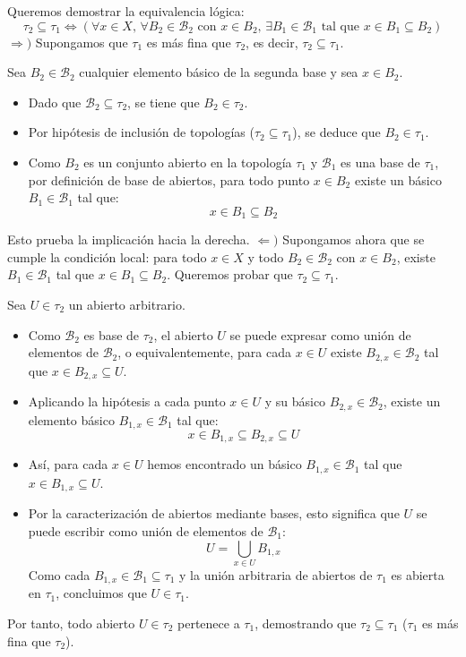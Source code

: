 \begin{sol}
    Queremos demostrar la equivalencia lógica:
    \[
        \tau_2 \subseteq \tau_1 \iff \left( \forall x \in X, \, \forall B_2 \in \mathcal{B}_2 \text{ con } x \in B_2, \, \exists B_1 \in \mathcal{B}_1 \text{ tal que } x \in B_1 \subseteq B_2 \right)
    \]
    $\Rightarrow)$ Supongamos que $\tau_1$ es más fina que $\tau_2$, es decir, $\tau_2 \subseteq \tau_1$.
    
    Sea $B_2 \in \mathcal{B}_2$ cualquier elemento básico de la segunda base y sea $x \in B_2$.
    \begin{itemize}
        \item Dado que $\mathcal{B}_2 \subseteq \tau_2$, se tiene que $B_2 \in \tau_2$.
        \item Por hipótesis de inclusión de topologías ($\tau_2 \subseteq \tau_1$), se deduce que $B_2 \in \tau_1$.
        \item Como $B_2$ es un conjunto abierto en la topología $\tau_1$ y $\mathcal{B}_1$ es una base de $\tau_1$, por definición de base de abiertos, para todo punto $x \in B_2$ existe un básico $B_1 \in \mathcal{B}_1$ tal que:
        \[
            x \in B_1 \subseteq B_2
        \]
    \end{itemize}
    Esto prueba la implicación hacia la derecha.
    $\Leftarrow)$ Supongamos ahora que se cumple la condición local: para todo $x \in X$ y todo $B_2 \in \mathcal{B}_2$ con $x \in B_2$, existe $B_1 \in \mathcal{B}_1$ tal que $x \in B_1 \subseteq B_2$. Queremos probar que $\tau_2 \subseteq \tau_1$.

    Sea $U \in \tau_2$ un abierto arbitrario.
    \begin{itemize}
        \item Como $\mathcal{B}_2$ es base de $\tau_2$, el abierto $U$ se puede expresar como unión de elementos de $\mathcal{B}_2$, o equivalentemente, para cada $x \in U$ existe $B_{2, x} \in \mathcal{B}_2$ tal que $x \in B_{2, x} \subseteq U$.
        \item Aplicando la hipótesis a cada punto $x \in U$ y su básico $B_{2, x} \in \mathcal{B}_2$, existe un elemento básico $B_{1, x} \in \mathcal{B}_1$ tal que:
        \[
            x \in B_{1, x} \subseteq B_{2, x} \subseteq U
        \]
        \item Así, para cada $x \in U$ hemos encontrado un básico $B_{1, x} \in \mathcal{B}_1$ tal que $x \in B_{1, x} \subseteq U$.
        \item Por la caracterización de abiertos mediante bases, esto significa que $U$ se puede escribir como unión de elementos de $\mathcal{B}_1$:
        \[
            U = \bigcup_{x \in U} B_{1, x}
        \]
        Como cada $B_{1, x} \in \mathcal{B}_1 \subseteq \tau_1$ y la unión arbitraria de abiertos de $\tau_1$ es abierta en $\tau_1$, concluimos que $U \in \tau_1$.
    \end{itemize}

    Por tanto, todo abierto $U \in \tau_2$ pertenece a $\tau_1$, demostrando que $\tau_2 \subseteq \tau_1$ ($\tau_1$ es más fina que $\tau_2$).
\end{sol}
